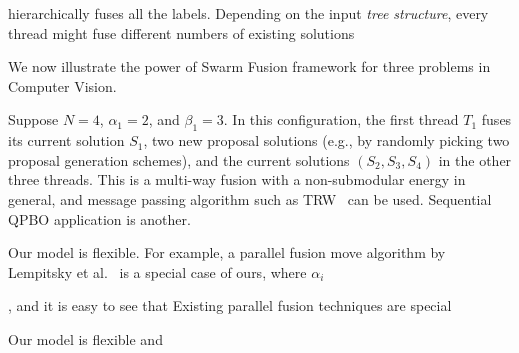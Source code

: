 hierarchically fuses all the
labels. Depending on the input {\it tree structure}, every thread might
fuse different numbers of existing solutions




We now illustrate the power of Swarm Fusion framework for three problems
in Computer Vision. 


Suppose $N=4$, $\alpha_1 = 2$, and $\beta_1 = 3$. In this
configuration, the first thread $T_1$ fuses its current solution $S_1$,
two new proposal solutions (e.g., by randomly picking two proposal
generation schemes), and the current solutions $(S_2, S_3, S_4)$ in the
other three threads. This is a multi-way fusion with a non-submodular
energy in general, and message passing algorithm such as
TRW~\cite{kolmogorov} can be used. Sequential QPBO application is
another.


Our model is flexible. For example, a parallel fusion move algorithm by
Lempitsky et al.~\cite{viktor} is a special case of ours, where $\alpha_i$

, and it is easy to see that 
Existing parallel fusion techniques are special 

Our model is flexible and 
